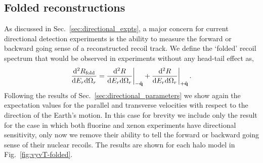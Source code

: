 \subsection{Folded reconstructions}
As discussed in Sec.~\ref{sec:directional_expts}, a major concern for current directional detection experiments is the ability to measure the forward or backward going sense of a reconstructed recoil track. We define the `folded' recoil spectrum that would be observed in experiments without any head-tail effect as,
\begin{equation}
 \frac{\mathrm{d}^2R_\mathrm{fold}}{\mathrm{d}E_r\mathrm{d}\Omega_r} = \frac{\mathrm{d}^2R}{\mathrm{d}E_r\mathrm{d}\Omega_r}\bigg|_{-\hat{\mathbf{q}}}+\frac{\mathrm{d}^2R}{\mathrm{d}E_r\mathrm{d}\Omega_r}\bigg|_{+\hat{\mathbf{q}}} \, .
\end{equation}
Following the results of Sec.~\ref{sec:directional_parameters} we show again the expectation values for the parallel and transverse velocities with respect to the direction of the Earth's motion. In this case for brevity we include only the result for the case in which both fluorine and xenon experiments have directional sensitivity, only now we remove their ability to tell the forward or backward going sense of their nuclear recoils. The results are shown for each halo model in Fig.~\ref{fig:vyvT-folded}.

